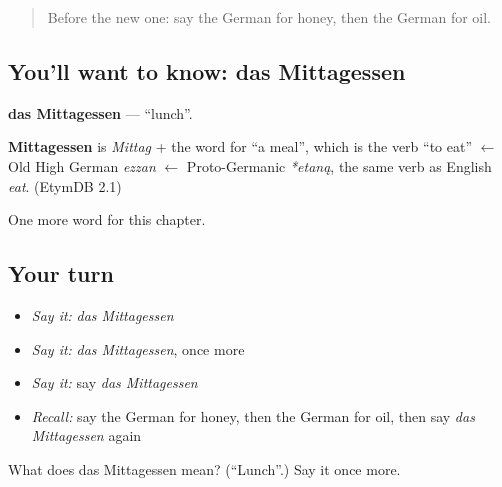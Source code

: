 \begin{quote}
Before the new one: say the German for honey, then the German for oil.
\end{quote}

\subsection*{You'll want to know: das Mittagessen}
\textbf{das Mittagessen} — \textquotedblleft{}lunch\textquotedblright{}.

\begin{cousinweb}
\textbf{Mittagessen} is \emph{Mittag} + the word for \textquotedblleft{}a meal\textquotedblright{}, which is the verb \textquotedblleft{}to eat\textquotedblright{} $\leftarrow$ Old High German \emph{ezzan} $\leftarrow$ Proto-Germanic \emph{*etaną}, the same verb as English \emph{eat}. (EtymDB 2.1)
\end{cousinweb}

\begin{grammarlens}[title={What you've built}]
One more word for this chapter.
\end{grammarlens}

\subsection*{Your turn}
\begin{itemize}
\raggedright
  \item \emph{Say it:} \emph{das Mittagessen}
  \item \emph{Say it:} \emph{das Mittagessen}, once more
  \item \emph{Say it:} say \emph{das Mittagessen}
  \item \emph{Recall:} say the German for honey, then the German for oil, then say \emph{das Mittagessen} again
\end{itemize}

\begin{tcolorbox}[breakable,colback=teal!4,colframe=teal!35!black,title={Before you move on}]
What does das Mittagessen mean? (\textquotedblleft{}Lunch\textquotedblright{}.) Say it once more.
\end{tcolorbox}

